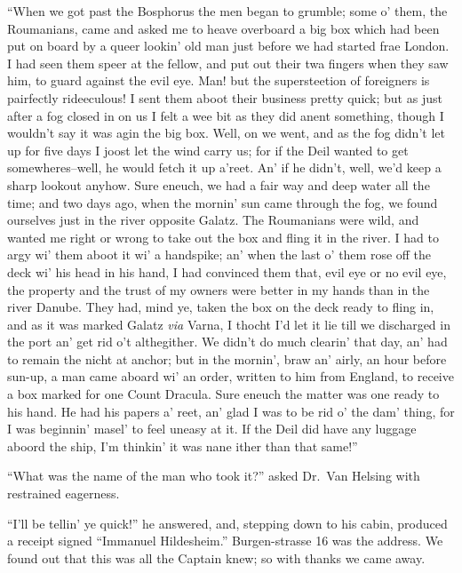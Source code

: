 \documentclass[12pt,openright]{book}
\begin{document}
“When we got past the Bosphorus the men began to grumble; some o’ them, the Roumanians, came and asked me to heave overboard a big box which had been put on board by a queer lookin’ old man just before we had started frae London. I had seen them speer at the fellow, and put out their twa fingers when they saw him, to guard against the evil eye. Man! but the supersteetion of foreigners is pairfectly rideeculous! I sent them aboot their business pretty quick; but as just after a fog closed in on us I felt a wee bit as they did anent something, though I wouldn’t say it was agin the big box. Well, on we went, and as the fog didn’t let up for five days I joost let the wind carry us; for if the Deil wanted to get somewheres–well, he would fetch it up a’reet. An’ if he didn’t, well, we’d keep a sharp lookout anyhow. Sure eneuch, we had a fair way and deep water all the time; and two days ago, when the mornin’ sun came through the fog, we found ourselves just in the river opposite Galatz. The Roumanians were wild, and wanted me right or wrong to take out the box and fling it in the river. I had to argy wi’ them aboot it wi’ a handspike; an’ when the last o’ them rose off the deck wi’ his head in his hand, I had convinced them that, evil eye or no evil eye, the property and the trust of my owners were better in my hands than in the river Danube. They had, mind ye, taken the box on the deck ready to fling in, and as it was marked Galatz \textit{via} Varna, I thocht I’d let it lie till we discharged in the port an’ get rid o’t althegither. We didn’t do much clearin’ that day, an’ had to remain the nicht at anchor; but in the mornin’, braw an’ airly, an hour before sun-up, a man came aboard wi’ an order, written to him from England, to receive a box marked for one Count Dracula. Sure eneuch the matter was one ready to his hand. He had his papers a’ reet, an’ glad I was to be rid o’ the dam’ thing, for I was beginnin’ masel’ to feel uneasy at it. If the Deil did have any luggage aboord the ship, I’m thinkin’ it was nane ither than that same!”

“What was the name of the man who took it?” asked Dr. Van Helsing with restrained eagerness.

“I’ll be tellin’ ye quick!” he answered, and, stepping down to his cabin, produced a receipt signed “Immanuel Hildesheim.” Burgen-strasse 16 was the address. We found out that this was all the Captain knew; so with thanks we came away.
\end{document}
